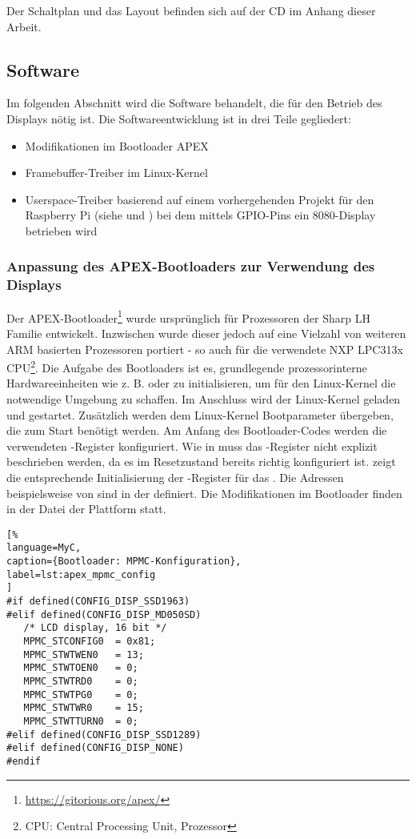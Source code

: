 Der Schaltplan und das Layout befinden sich auf der CD im Anhang dieser Arbeit.
\newpage
\subsection{Software}
Im folgenden Abschnitt wird die Software behandelt, die für den Betrieb des Displays nötig ist.
Die Softwareentwicklung ist in drei Teile gegliedert:
\begin{itemize}
\item Modifikationen im Bootloader APEX
\item Framebuffer-Treiber im Linux-Kernel
\item Userspace-Treiber basierend auf einem vorhergehenden Projekt für den Raspberry Pi (siehe \cite{Schlegel2013a} und \cite{Schlegel2013b}) bei dem mittels GPIO-Pins ein 8080-Display betrieben wird
\end{itemize}

\subsubsection{Anpassung des APEX-Bootloaders zur Verwendung des Displays}
Der APEX-Bootloader\footnote{\url{https://gitorious.org/apex/}} wurde ursprünglich für Prozessoren der Sharp LH Familie entwickelt. Inzwischen wurde dieser jedoch auf eine Vielzahl von weiteren ARM basierten Prozessoren portiert - so auch für die verwendete NXP LPC313x CPU\footnote{CPU: Central Processing Unit, Prozessor}.
Die Aufgabe des Bootloaders ist es, grundlegende prozessorinterne Hardwareeinheiten wie z. B.  oder  zu initialisieren, um für den Linux-Kernel die notwendige Umgebung zu schaffen. Im Anschluss wird der Linux-Kernel geladen und gestartet. Zusätzlich werden dem Linux-Kernel Bootparameter übergeben, die zum Start benötigt werden. Am Anfang des Bootloader-Codes werden die verwendeten -Register konfiguriert. Wie in  muss das -Register  nicht explizit beschrieben werden, da es im Resetzustand bereits richtig konfiguriert ist.  zeigt die entsprechende Initialisierung der -Register für das . Die Adressen beispielsweise von  sind in der  definiert. Die Modifikationen im Bootloader finden in der Datei  der Plattform statt.

\begin{lstlisting}[%
language=MyC,
caption={Bootloader: MPMC-Konfiguration},
label=lst:apex_mpmc_config
]
#if defined(CONFIG_DISP_SSD1963)
#elif defined(CONFIG_DISP_MD050SD)
   /* LCD display, 16 bit */
   MPMC_STCONFIG0  = 0x81;
   MPMC_STWTWEN0   = 13;
   MPMC_STWTOEN0   = 0;
   MPMC_STWTRD0    = 0;
   MPMC_STWTPG0    = 0;
   MPMC_STWTWR0    = 15;
   MPMC_STWTTURN0  = 0;
#elif defined(CONFIG_DISP_SSD1289)
#elif defined(CONFIG_DISP_NONE)
#endif
\end{lstlisting}


